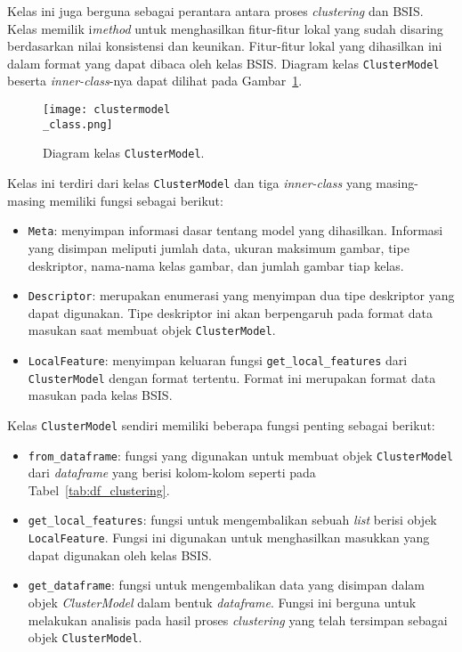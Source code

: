 Kelas ini juga berguna sebagai perantara antara proses \textit{clustering} dan BSIS. Kelas memilik i\textit{method} untuk menghasilkan fitur-fitur lokal yang sudah disaring berdasarkan nilai konsistensi dan keunikan. Fitur-fitur lokal yang dihasilkan ini dalam format yang dapat dibaca oleh kelas BSIS. Diagram kelas \texttt{ClusterModel} beserta \textit{inner-class}-nya dapat dilihat pada Gambar~\ref{fig:clustermodel_class}.
\begin{figure}[H]
	\centering
	\texttt{[image: clustermodel\\\_class.png]}
	\caption{Diagram kelas \texttt{ClusterModel}.}
	\label{fig:clustermodel_class}
\end{figure}
Kelas ini terdiri dari kelas \texttt{ClusterModel} dan tiga \textit{inner-class} yang masing-masing memiliki fungsi sebagai berikut:
\begin{itemize}
	\item \texttt{Meta}: menyimpan informasi dasar tentang model yang dihasilkan. Informasi yang disimpan meliputi jumlah data, ukuran maksimum gambar, tipe deskriptor, nama-nama kelas gambar, dan jumlah gambar tiap kelas. 
	\item \texttt{Descriptor}: merupakan enumerasi yang menyimpan dua tipe deskriptor yang dapat digunakan. Tipe deskriptor ini akan berpengaruh pada format data masukan saat membuat objek \texttt{ClusterModel}.
	\item \texttt{LocalFeature}: menyimpan keluaran fungsi \texttt{get\_local\_features} dari  \texttt{ClusterModel} dengan format tertentu. Format ini merupakan format data masukan pada kelas BSIS.
\end{itemize}
Kelas \texttt{ClusterModel} sendiri memiliki beberapa fungsi penting sebagai berikut:
\begin{itemize}
	\item \texttt{from\_dataframe}: fungsi yang digunakan untuk membuat objek \texttt{ClusterModel} dari \textit{dataframe} yang berisi kolom-kolom seperti pada Tabel~\ref{tab:df_clustering}.
	\item \texttt{get\_local\_features}: fungsi untuk mengembalikan sebuah \textit{list} berisi objek \texttt{LocalFeature}. Fungsi ini digunakan untuk menghasilkan masukkan yang dapat digunakan oleh kelas BSIS.
	\item \texttt{get\_dataframe}: fungsi untuk mengembalikan data yang disimpan dalam objek \textit{ClusterModel} dalam bentuk \textit{dataframe}. Fungsi ini berguna untuk melakukan analisis pada hasil proses \textit{clustering} yang telah tersimpan sebagai objek \texttt{ClusterModel}.
\end{itemize}


